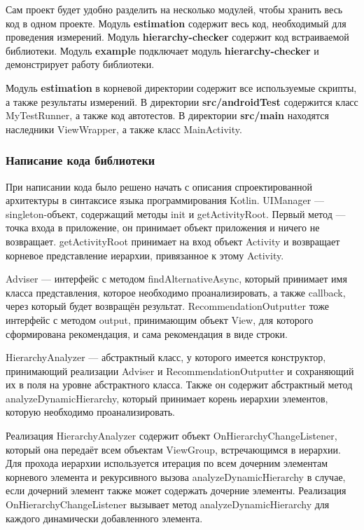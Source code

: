 \documentclass[a4paper,14pt]{extarticle} %
\begin{document}
	Сам проект будет удобно разделить на несколько модулей, чтобы хранить весь код в одном проекте. Модуль \textbf{estimation} содержит весь код, необходимый для проведения измерений. Модуль \textbf{hierarchy-checker} содержит код встраиваемой библиотеки. Модуль \textbf{example} подключает модуль \textbf{hierarchy-checker} и демонстрирует работу библиотеки.
	
	Модуль \textbf{estimation} в корневой директории содержит все используемые скрипты, а также результаты измерений. В директории \textbf{src/androidTest} содержится класс MyTestRunner, а также код автотестов. В директории \textbf{src/main} находятся наследники ViewWrapper, а также класс MainActivity.
	
	\subsubsection{Написание кода библиотеки}
	
	При написании кода было решено начать с описания спроектированной архитектуры в синтаксисе языка программирования Kotlin. UIManager --- singleton-объект, содержащий методы init и getActivityRoot. Первый метод ---  точка входа в приложение, он принимает объект приложения и ничего не возвращает. getActivityRoot принимает на вход объект Activity и возвращает корневое представление иерархии, привязанное к этому Activity. 
	
	Adviser --- интерфейс с методом findAlternativeAsync, который принимает имя класса представления, которое необходимо проанализировать, а также callback, через который будет возвращён результат. RecommendationOutputter тоже интерфейс с методом output, принимающим объект View, для которого сформирована рекомендация, и сама рекомендация в виде строки. 
	
	HierarchyAnalyzer ---  абстрактный класс, у которого имеется конструктор, принимающий реализации Adviser и RecommendationOutputter и сохраняющий их в поля на уровне абстрактного класса. Также он содержит абстрактный метод analyzeDynamicHierarchy, который принимает корень иерархии элементов, которую необходимо проанализировать.
	
	Реализация HierarchyAnalyzer содержит объект OnHierarchyChangeListener, который она передаёт всем объектам ViewGroup, встречающимся в иерархии. Для прохода иерархии используется итерация по всем дочерним элементам корневого элемента и рекурсивного вызова analyzeDynamicHierarchy в случае, если дочерний элемент также может содержать дочерние элементы. Реализация OnHierarchyChangeListener вызывает метод analyzeDynamicHierarchy для каждого динамически добавленного элемента.
	
\end{document}
